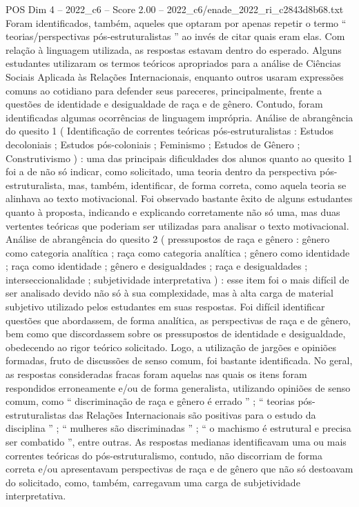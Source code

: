 \begin{textsample}{POS Dim 4 – 2022\_c6 – Score 2.00 – 2022\_c6/enade\_2022\_ri\_c2843d8b68.txt}
Foram identificados, também, aqueles que optaram por apenas repetir o termo “ teorias/perspectivas pós-estruturalistas ” ao invés de citar quais eram elas.
Com relação à linguagem utilizada, as respostas estavam dentro do esperado.
Alguns estudantes utilizaram os termos teóricos apropriados para a análise de Ciências Sociais Aplicada às Relações Internacionais, enquanto outros usaram expressões comuns ao cotidiano para defender seus pareceres, principalmente, frente a questões de identidade e desigualdade de raça e de gênero.
Contudo, foram identificadas algumas ocorrências de linguagem imprópria.
Análise de abrangência do quesito 1 ( Identificação de correntes teóricas pós-estruturalistas : Estudos decoloniais ; Estudos pós-coloniais ; Feminismo ; Estudos de Gênero ; Construtivismo ) : uma das principais dificuldades dos alunos quanto ao quesito 1 foi a de não só indicar, como solicitado, uma teoria dentro da perspectiva pós-estruturalista, mas, também, identificar, de forma correta, como aquela teoria se alinhava ao texto motivacional.
Foi observado bastante êxito de alguns estudantes quanto à proposta, indicando e explicando corretamente não só uma, mas duas vertentes teóricas que poderiam ser utilizadas para analisar o texto motivacional.
Análise de abrangência do quesito 2 ( pressupostos de raça e gênero : gênero como categoria analítica ; raça como categoria analítica ; gênero como identidade ; raça como identidade ; gênero e desigualdades ; raça e desigualdades ; interseccionalidade ; subjetividade interpretativa ) : esse item foi o mais difícil de ser analisado devido não só à sua complexidade, mas à alta carga de material subjetivo utilizado pelos estudantes em suas respostas.
Foi difícil identificar questões que abordassem, de forma analítica, as perspectivas de raça e de gênero, bem como que discordassem sobre os pressupostos de identidade e desigualdade, obedecendo ao rigor teórico solicitado.
Logo, a utilização de jargões e opiniões formadas, fruto de discussões de senso comum, foi bastante identificada.
No geral, as respostas consideradas fracas foram aquelas nas quais os itens foram respondidos erroneamente e/ou de forma generalista, utilizando opiniões de senso comum, como “ discriminação de raça e gênero é errado ” ; “ teorias pós-estruturalistas das Relações Internacionais são positivas para o estudo da disciplina ” ; “ mulheres são discriminadas ” ; “ o machismo é estrutural e precisa ser combatido ”, entre outras.
As respostas medianas identificavam uma ou mais correntes teóricas do pós-estruturalismo, contudo, não discorriam de forma correta e/ou apresentavam perspectivas de raça e de gênero que não só destoavam do solicitado, como, também, carregavam uma carga de subjetividade interpretativa.

\end{textsample}
